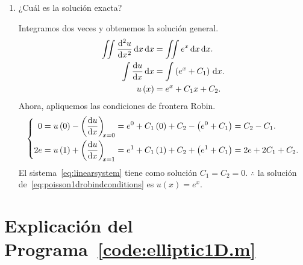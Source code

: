 \begin{problem}
\begin{enumerate}
    \item

          ¿Cuál es la solución exacta?

          \begin{solution}
              Integramos dos veces y obtenemos la solución general.
              \begin{align*}
                  \iint
                  \diff[2]{u}{x}
                  \dl x
                  \dl x           & =
                  \iint
                  e^{x}
                  \dl x
                  \dl x.              \\
                  \int
                  \diff{u}{x}
                  \dl x           & =
                  \int
                  \left(e^{x}+C_{1}\right)
                  \dl x.              \\
                  u\left(x\right) & =
                  e^{x}+C_{1}x+C_{2}.
              \end{align*}
              Ahora, apliquemos las condiciones de frontera Robin.
              \begin{equation}\label{eq:linearsystem}
                  \left\{
                  \begin{aligned}
                      0
                       & =
                      u\left(0\right)-
                      \diff{u}{x}[x=0]=
                      e^{0}+C_{1}\left(0\right)+C_{2}-
                      \left(e^{0}+C_{1}\right)=
                      C_{2}-C_{1}. \\
                      2e
                       & =
                      u\left(1\right)+
                      \diff{u}{x}[x=1]=
                      e^{1}+C_{1}\left(1\right)+C_{2}+
                      \left(e^{1}+C_{1}\right)=
                      2e+2C_{1}+C_{2}.
                  \end{aligned}
                  \right.
              \end{equation}
              El sistema~\eqref{eq:linearsystem} tiene como solución
              $C_{1}=C_{2}=0$.
              $\therefore$ la solución
              de~\eqref{eq:poisson1drobindconditions} es
              $u\left(x\right)=e^{x}$.
              \noQED
          \end{solution}
\end{enumerate}

\section*{Explicación del Programa~\ref{code:elliptic1D.m}} %


\end{problem}
